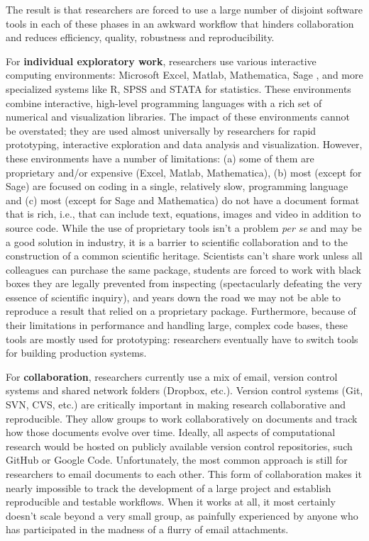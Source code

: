 \documentclass[ChapterTOCs,krantz2]{krantz} %
\begin{document}
The result is that researchers are forced to use a large
number of disjoint software tools in each of these phases in an awkward
workflow that hinders collaboration and reduces efficiency, quality,
robustness and reproducibility.

For \textbf{individual exploratory work}, researchers use various
interactive computing environments: Microsoft Excel, Matlab, Mathematica,
Sage \cite{sage}, and more specialized systems like R, SPSS and STATA
for statistics. These environments combine interactive, high-level
programming languages with a rich set of numerical and visualization
libraries. The impact of these environments cannot be overstated;
they are used almost universally by researchers for rapid prototyping,
interactive exploration and data analysis and visualization. However,
these environments have a number of limitations: (a) some of them
are proprietary and/or expensive (Excel, Matlab, Mathematica), (b)
most (except for Sage) are focused on coding in a single, relatively
slow, programming language and (c) most (except for Sage and Mathematica)
do not have a document format that is rich, i.e., that can include
text, equations, images and video in addition to source code. While
the use of proprietary tools isn't a problem \emph{per se} and may
be a good solution in industry, it is a barrier to scientific collaboration
and to the construction of a common scientific heritage. Scientists
can't share work unless all colleagues can purchase the same package,
students are forced to work with black boxes they are legally prevented
from inspecting (spectacularly defeating the very essence of scientific
inquiry), and years down the road we may not be able to reproduce
a result that relied on a proprietary package. Furthermore, because
of their limitations in performance and handling large, complex code
bases, these tools are mostly used for prototyping: researchers eventually
have to switch tools for building production systems.

For \textbf{collaboration}, researchers currently use a mix of email,
version control systems and shared network folders (Dropbox, etc.).
Version control systems (Git, SVN, CVS, etc.) are critically important
in making research collaborative and reproducible. They allow groups
to work collaboratively on documents and track how those documents
evolve over time. Ideally, all aspects of computational research would
be hosted on publicly available version control repositories, such
GitHub or Google Code. Unfortunately, the most common approach is
still for researchers to email documents to each other. This form
of collaboration makes it nearly impossible to track the development
of a large project and establish reproducible and testable workflows.
When it works at all, it most certainly doesn't scale beyond a very
small group, as painfully experienced by anyone who has participated
in the madness of a flurry of email attachments. 
\end{document}
